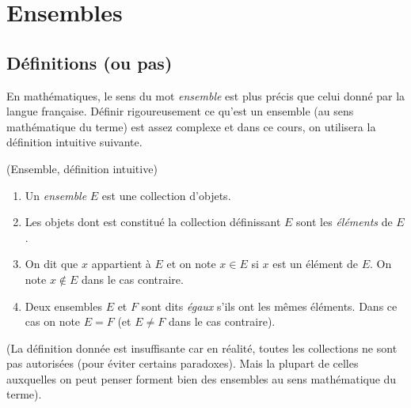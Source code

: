\chapter{Ensembles}
\minitoc
\hyperlink{toc}{\retourTOC}

\section{Définitions (ou pas)}

En mathématiques, le sens du mot \emph{ensemble} est plus précis que celui donné par la langue française. Définir rigoureusement ce qu'est un ensemble (au sens mathématique du terme) est assez complexe et dans ce cours, on utilisera la définition intuitive suivante.

\begin{definition}(Ensemble, définition intuitive)

\begin{enumerate}
\item Un \emph{ensemble} $E$ est une collection d'objets.
\item Les objets dont est constitué la collection définissant $E$  sont les \emph{éléments} de $E$.
\item On dit que $x$ appartient à $E$ et on note $x\in E$ si $x$ est un élément de $E$. On note $x\not\in E$ dans le cas contraire.
\item Deux ensembles $E$ et $F$ sont dits \emph{égaux} s'ils ont les mêmes éléments. Dans ce cas on note $E=F$ (et $E\neq F$ dans le cas contraire).
\end{enumerate}
\end{definition}

(La définition donnée est insuffisante car en réalité, toutes les collections ne sont pas autorisées (pour éviter certains paradoxes). Mais la plupart de celles auxquelles on peut penser forment bien des ensembles au sens mathématique du terme). 

